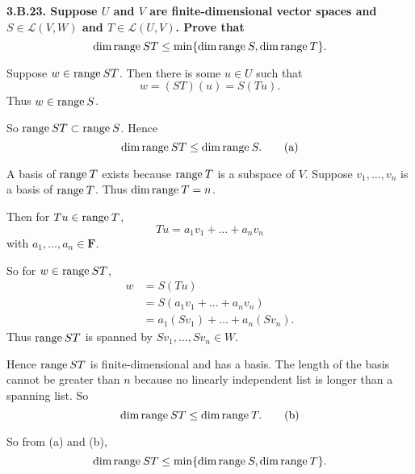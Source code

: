 \documentclass[a5paper]{article}
\begin{document}
\newcommand   \C           {\mathbf{C}}
\newcommand   \R           {\mathbf{R}}
\renewcommand \L           {\mathcal{L}}
\newcommand   \F           {\mathbf{F}}
\renewcommand \P           {\mathcal{P}}
\newcommand   \nullspace   {\text{null\:}}
\newcommand   \range       {\text{range\:}}
\newcommand   \linspan     {\text{span\:}}
\newcommand   \question[1] {\textbf{\boldmath#1\unboldmath}\par}

\question{
    3.B.23.
    Suppose $U$ and $V$ are finite-dimensional vector spaces and $S \in \L(V,W)$ and $T \in \L(U,V)$.
    Prove that
    \begin{equation*}
            \dim \range ST \le \min \{ \dim \range S, \dim \range T \} .
    \end{equation*}
}
    Suppose $w \in \range ST$.
    Then there is some $u \in U$ such that
\begin{equation*}
        w = (ST)(u) = S(Tu) .
\end{equation*}
    Thus $w \in \range S$.

    So $\range ST \subset \range S$.
    Hence
\begin{equation*}
         \dim \range ST \le \dim \range S . \tag{a}
\end{equation*}

    A basis of $\range T$ exists because $\range T$ is a subspace of $V$.
    Suppose $v_1,\dots,v_n$ is a basis of $\range T$.
    Thus $\dim \range T = n$.

    Then for $Tu \in \range T$,
\begin{equation*}
        Tu = a_1v_1 + \dots + a_nv_n
\end{equation*}
    with $a_1,\dots,a_n \in \F$.

    So for $w \in \range ST$,
\begin{align*}
        w &= S(Tu) \\
          &= S(a_1v_1 + \dots + a_nv_n) \\
          &= a_1(Sv_1) + \dots + a_n(Sv_n) .
\end{align*}
    Thus $\range ST$ is spanned by $Sv_1, \dots, Sv_n \in W$.

    Hence $\range ST$ is finite-dimensional and has a basis.
    The length of the basis cannot be greater than $n$ because no linearly independent list is longer than a spanning list.
    So
\begin{equation*}
         \dim \range ST \le \dim \range T . \tag{b}
\end{equation*}

    So from (a) and (b),
\begin{equation*}
         \dim \range ST \le \min \{\dim\range S, \dim\range T \} .
\end{equation*}
\end{document}
